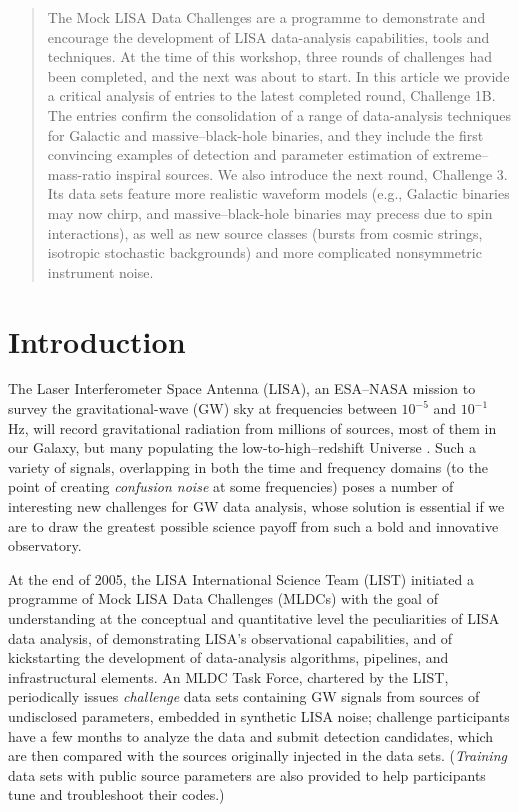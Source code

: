 \documentclass{iopart}
\begin{document}

\begin{abstract}
The Mock LISA Data Challenges are a programme to demonstrate and encourage the development of LISA data-analysis capabilities, tools and techniques. At the time of this workshop, three rounds of challenges had been completed, and the next was about to start.
In this article we provide a critical analysis of entries to the latest completed round, Challenge 1B. The entries confirm the consolidation of a range of data-analysis techniques for Galactic and massive--black-hole binaries, and they include the first convincing examples of detection and parameter estimation of extreme--mass-ratio inspiral sources.
We also introduce the next round, Challenge 3. Its data sets feature more realistic waveform models (e.g., Galactic binaries may now chirp, and massive--black-hole binaries may precess due to spin interactions), as well as new source classes (bursts from cosmic strings, isotropic stochastic backgrounds) and more complicated nonsymmetric instrument noise.
\end{abstract}



\section{Introduction}

The Laser Interferometer Space Antenna (LISA), an ESA--NASA mission to survey the gravitational-wave (GW) sky at frequencies between $10^{-5}$ and $10^{-1}$ Hz, will record gravitational radiation from millions of sources, most of them in our Galaxy, but many populating the low-to-high--redshift Universe \cite{lisa}.
Such a variety of signals, overlapping in both the time and frequency domains (to the point of creating \emph{confusion noise} at some frequencies) poses a number of interesting new challenges for GW data analysis, whose solution is essential if we are to draw the greatest possible science payoff from such a bold and innovative observatory.

At the end of 2005, the LISA International Science Team (LIST) initiated a programme of Mock LISA Data Challenges (MLDCs) with the goal of understanding at the conceptual and quantitative level the peculiarities of LISA data analysis, of demonstrating LISA's observational capabilities, and of kickstarting the development of data-analysis algorithms, pipelines, and infrastructural elements.
An MLDC Task Force, chartered by the LIST, periodically issues \emph{challenge} data sets containing GW signals from sources of undisclosed parameters, embedded in synthetic LISA noise; challenge participants have a few months to analyze the data and submit detection candidates, which are then compared with the sources originally injected in the data sets. (\emph{Training} data sets with public source parameters are also provided to help participants tune and troubleshoot their codes.)
\end{document}
